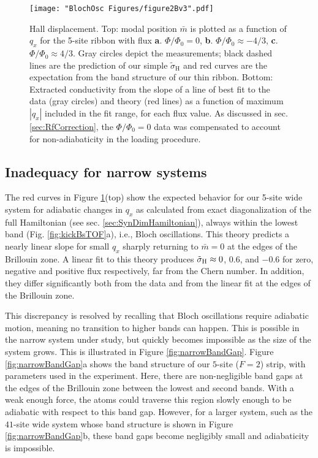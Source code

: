 \begin{figure}
\texttt{[image: "BlochOsc Figures/figure2Bv3".pdf]}
\caption[Hall displacement]{Hall displacement. Top: modal position $\bar{m}$ is plotted as a function of $q_x$ for the 5-site ribbon with flux \textbf{a}. $\Phi/\Phi_0=0$, \textbf{b}. $\Phi/\Phi_0\approx-4/3$, \textbf{c}. $\Phi/\Phi_0\approx4/3$. Gray circles depict the measurements; black dashed lines are the prediction of our simple $\tilde{\sigma}_\textrm{H}$ and red curves are the expectation from the band structure of our thin ribbon. Bottom: Extracted conductivity from the slope of a line of best fit to the data (gray circles) and theory (red lines) as a function of maximum $|q_x|$ included in the fit range, for each flux value. As discussed in sec. \ref{sec:RfCorrection}, the $\Phi/\Phi_0=0$ data was compensated to account for non-adiabaticity in the loading procedure. }
\label{fig:magnetization}
\end{figure}


\subsection{Inadequacy for narrow systems}
The red curves in Figure \ref{fig:magnetization}(top) show the expected behavior for our 5-site wide system for adiabatic changes in $q_x$ as calculated from exact diagonalization of the full Hamiltonian (see sec. \ref{sec:SynDimHamiltonian}), always within the lowest band (Fig. \ref{fig:kickBsTOF}a), i.e., Bloch oscillations.  This theory predicts a nearly linear slope for small $q_x$ sharply returning to $\bar{m}=0$ at the edges of the Brillouin zone. A linear fit to this theory produces $\tilde{\sigma}_{\rm{H}}\approx0$, $0.6$, and $-0.6$ for zero, negative and positive flux respectively, far from the Chern number. In addition, they differ significantly both from the data and from the linear fit at the edges of the Brillouin zone.

This discrepancy is resolved by recalling that Bloch oscillations require adiabatic motion, meaning no transition to higher bands can happen. This is possible in the narrow system under study, but quickly becomes impossible as the size of the system grows. This is illustrated in Figure \ref{fig:narrowBandGap}.  Figure \ref{fig:narrowBandGap}a shows the band structure of our $5$-site ($F=2$) strip, with parameters used in the experiment. Here, there are non-negligible band gaps at the edges of the Brillouin zone between the lowest and second bands. With a weak enough force, the atoms could traverse this region slowly enough to be adiabatic with respect to this band gap. However, for a larger system, such as the $41$-site wide system whose band structure is shown in  Figure \ref{fig:narrowBandGap}b, these band gaps become negligibly small and adiabaticity is impossible. 

